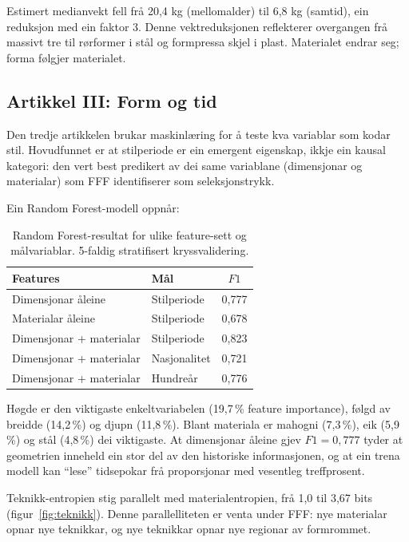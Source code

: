 \documentclass[10pt, a4paper, twocolumn]{article}
\begin{document}
Estimert medianvekt fell frå 20,4 kg (mellomalder) til 6,8 kg (samtid), ein reduksjon med ein faktor 3. Denne vektreduksjonen reflekterer overgangen frå massivt tre til rørformer i stål og formpressa skjel i plast. Materialet endrar seg; forma følgjer materialet.

\subsection{Artikkel III: Form og tid}

Den tredje artikkelen brukar maskinlæring for å teste kva variablar som kodar stil. Hovudfunnet er at stilperiode er ein emergent eigenskap, ikkje ein kausal kategori: den vert best predikert av dei same variablane (dimensjonar og materialar) som FFF identifiserer som seleksjonstrykk.

Ein Random Forest-modell \citep{breiman2001} oppnår:

\begin{table}[!ht]
\centering
\begin{tabular}{@{}llc@{}}
\toprule
\textbf{Features} & \textbf{Mål} & \textbf{$F1$} \\
\midrule
Dimensjonar åleine & Stilperiode & 0,777 \\
Materialar åleine & Stilperiode & 0,678 \\
Dimensjonar + materialar & Stilperiode & 0,823 \\
Dimensjonar + materialar & Nasjonalitet & 0,721 \\
Dimensjonar + materialar & Hundreår & 0,776 \\
\bottomrule
\end{tabular}
\caption{Random Forest-resultat for ulike feature-sett og målvariablar. 5-faldig stratifisert kryssvalidering.}
\label{tab:rf}
\end{table}

Høgde er den viktigaste enkeltvariabelen (19,7\,\% feature importance), følgd av breidde (14,2\,\%) og djupn (11,8\,\%). Blant materiala er mahogni (7,3\,\%), eik (5,9\,\%) og stål (4,8\,\%) dei viktigaste. At dimensjonar åleine gjev $F1 = 0{,}777$ tyder at geometrien inneheld ein stor del av den historiske informasjonen, og at ein trena modell kan ``lese'' tidsepokar frå proporsjonar med vesentleg treffprosent.

Teknikk-entropien stig parallelt med materialentropien, frå 1,0 til 3,67 bits (figur~\ref{fig:teknikk}). Denne parallelliteten er venta under FFF: nye materialar opnar nye teknikkar, og nye teknikkar opnar nye regionar av formrommet.
\end{document}
